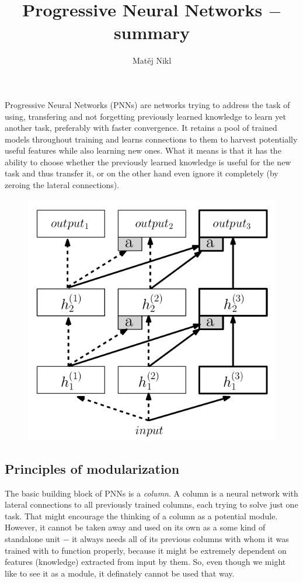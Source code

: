 \documentclass[a4paper,twocolumn]{article}
\title{Progressive Neural Networks $-$ summary}
\author{Matěj Nikl}
\begin{document}
\maketitle
Progressive Neural Networks (PNNs) are networks trying to address the task of using, transfering and not forgetting previously learned knowledge to learn yet another task, preferably with faster convergence. It retains a pool of trained models throughout training and learns connections to them to harvest potentially useful features while also learning new ones. What it means is that it has the ability to choose whether the previously learned knowledge is useful for the new task and thus transfer it, or on the other hand even ignore it completely (by zeroing the lateral connections).

    \begin{figure}[!h]
        \centering
        \includegraphics[width=0.8\columnwidth]{PNN.png}
    \end{figure}

\subsection*{Principles of modularization}
The basic building block of PNNs is a \textit{column}. A column is a neural network with lateral connections to all previously trained columns, each trying to solve just one task. That might encourage the thinking of a column as a potential module. However, it cannot be taken away and used on its own as a some kind of standalone unit $-$ it always needs all of its previous columns with whom it was trained with to function properly, because it might be extremely dependent on features (knowledge) extracted from input by them. So, even though we might like to see it as a module, it definately cannot be used that way.
\end{document}

